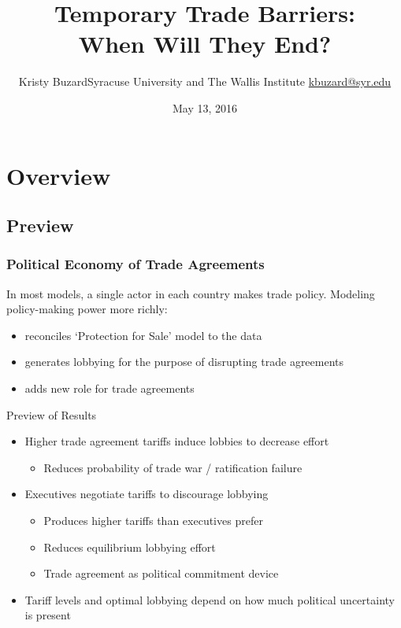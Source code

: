 \documentclass[handout]{beamer}
\title[Temporary Trade Barriers: When Will They End?\hspace{2.15in}\insertframenumber/\inserttotalframenumber]{Temporary Trade Barriers: \\ When Will They End?}
\author[Kristy Buzard]{\texorpdfstring{Kristy Buzard\newline Syracuse University and The Wallis Institute  \newline\url{kbuzard@syr.edu}}{Kristy Buzard}}
\date{May 13, 2016}
\begin{document}
\maketitle




\section{Overview}
\subsection{Preview}
\begin{frame}
\frametitle{Political Economy of Trade Agreements}
In most models, a single actor in each country makes trade policy. Modeling policy-making power more richly:
\pause
\begin{itemize}[<+->]
	\item reconciles `Protection for Sale' model to the data
  \item generates lobbying for the purpose of disrupting trade agreements  
	\item adds new role for trade agreements 
\end{itemize}
\end{frame}


\begin{frame}{Preview of Results}
\begin{itemize}[<+->]
	\item Higher trade agreement tariffs induce lobbies to decrease effort 
		\begin{itemize}
			\item Reduces probability of trade war / ratification failure
		\end{itemize}
	\item Executives negotiate tariffs to discourage lobbying
		\begin{itemize}
			\item Produces higher tariffs than executives prefer
			\item Reduces equilibrium lobbying effort
			\item Trade agreement as political commitment device
		\end{itemize}
	\item Tariff levels and optimal lobbying depend on how much political uncertainty is present
\end{itemize}
\end{frame}
\end{document}
